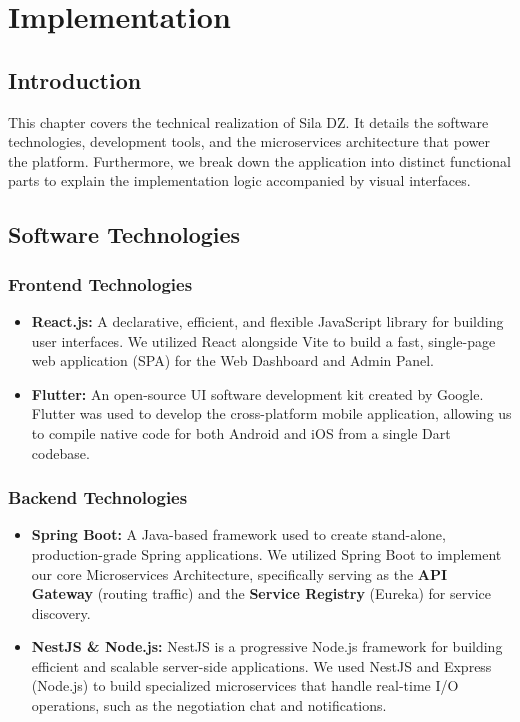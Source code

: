 \chapter{Implementation}

\section{Introduction}
This chapter covers the technical realization of Sila DZ. It details the software technologies, development tools, and the microservices architecture that power the platform. Furthermore, we break down the application into distinct functional parts to explain the implementation logic accompanied by visual interfaces.

\section{Software Technologies}

\subsection{Frontend Technologies}
\begin{itemize}
    \item \textbf{React.js:} A declarative, efficient, and flexible JavaScript library for building user interfaces. We utilized React alongside Vite to build a fast, single-page web application (SPA) for the Web Dashboard and Admin Panel.
    \item \textbf{Flutter:} An open-source UI software development kit created by Google. Flutter was used to develop the cross-platform mobile application, allowing us to compile native code for both Android and iOS from a single Dart codebase.
\end{itemize}

\subsection{Backend Technologies}
\begin{itemize}
    \item \textbf{Spring Boot:} A Java-based framework used to create stand-alone, production-grade Spring applications. We utilized Spring Boot to implement our core Microservices Architecture, specifically serving as the \textbf{API Gateway} (routing traffic) and the \textbf{Service Registry} (Eureka) for service discovery.
    \item \textbf{NestJS \& Node.js:} NestJS is a progressive Node.js framework for building efficient and scalable server-side applications. We used NestJS and Express (Node.js) to build specialized microservices that handle real-time I/O operations, such as the negotiation chat and notifications.
\end{itemize}

